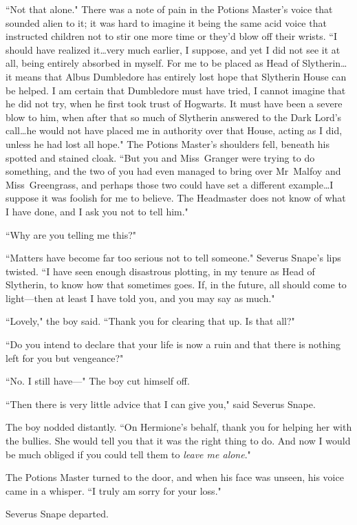 ``Not that alone." There was a note of pain in the Potions Master's voice that sounded alien to it; it was hard to imagine it being the same acid voice that instructed children not to stir one more time or they'd blow off their wrists. ``I should have realized it…very much earlier, I suppose, and yet I did not see it at all, being entirely absorbed in myself. For me to be placed as Head of Slytherin…it means that Albus Dumbledore has entirely lost hope that Slytherin House can be helped. I am certain that Dumbledore must have tried, I cannot imagine that he did not try, when he first took trust of Hogwarts. It must have been a severe blow to him, when after that so much of Slytherin answered to the Dark Lord's call…he would not have placed me in authority over that House, acting as I did, unless he had lost all hope." The Potions Master's shoulders fell, beneath his spotted and stained cloak. ``But you and Miss~Granger were trying to do something, and the two of you had even managed to bring over Mr~Malfoy and Miss~Greengrass, and perhaps those two could have set a different example…I suppose it was foolish for me to believe. The Headmaster does not know of what I have done, and I ask you not to tell him."

``Why are you telling me this?"

``Matters have become far too serious not to tell someone." Severus Snape's lips twisted. ``I have seen enough disastrous plotting, in my tenure as Head of Slytherin, to know how that sometimes goes. If, in the future, all should come to light—then at least I have told you, and you may say as much."

``Lovely," the boy said. ``Thank you for clearing that up. Is that all?"

``Do you intend to declare that your life is now a ruin and that there is nothing left for you but vengeance?"

``No. I still have—" The boy cut himself off.

``Then there is very little advice that I can give you," said Severus Snape.

The boy nodded distantly. ``On Hermione's behalf, thank you for helping her with the bullies. She would tell you that it was the right thing to do. And now I would be much obliged if you could tell them to \emph{leave me alone}."

The Potions Master turned to the door, and when his face was unseen, his voice came in a whisper. ``I truly am sorry for your loss."

Severus Snape departed.

